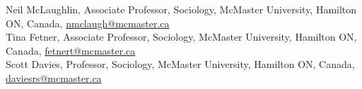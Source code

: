 \documentclass[11pt,usenames,dvipsnames]{article}
\begin{document}




\noindent Neil McLaughlin, Associate Professor, Sociology, McMaster University, Hamilton ON, Canada, \href{mailto:nmclaugh@mcmaster.ca}{nmclaugh@mcmaster.ca}\\

\noindent Tina Fetner, Associate Professor, Sociology, McMaster University, Hamilton ON, Canada, \href{mailto:fetnert@mcmaster.ca}{fetnert@mcmaster.ca}\\

\noindent Scott Davies, Professor, Sociology, McMaster University, Hamilton ON, Canada, \href{mailto:daviesrs@mcmaster.ca}{daviesrs@mcmaster.ca}\\

\end{document}
